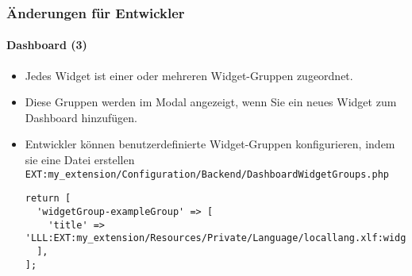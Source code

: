 \begin{frame}[fragile]
	\frametitle{Änderungen für Entwickler}
	\framesubtitle{Dashboard (3)}

	\lstset{basicstyle=\tiny\ttfamily}

	\begin{itemize}
		\item Jedes Widget ist einer oder mehreren Widget-Gruppen zugeordnet.
		\item Diese Gruppen werden im Modal angezeigt, wenn Sie ein neues Widget zum Dashboard hinzufügen.
		\item Entwickler können benutzerdefinierte Widget-Gruppen konfigurieren, indem sie eine Datei erstellen\newline
			\smaller
				\texttt{EXT:my\_extension/Configuration/Backend/DashboardWidgetGroups.php}
			\normalsize

\vspace{-0.4cm}
\begin{lstlisting}
return [
  'widgetGroup-exampleGroup' => [
    'title' => 'LLL:EXT:my_extension/Resources/Private/Language/locallang.xlf:widget_group_name',
  ],
];
\end{lstlisting}

	\end{itemize}

\end{frame}


